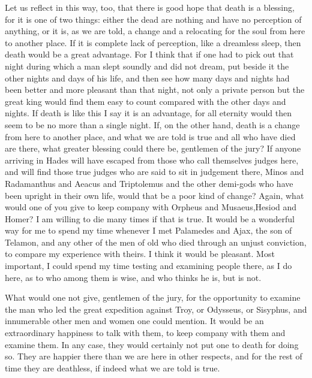 Let us reflect in this way, too, that there is good hope that death is a blessing, for it is one of
two things: either the dead are nothing and have no perception of anything, or it is, as we are told,
a change and a relocating for the soul from here to another place. If it is complete lack of
perception, like a dreamless sleep, then death would be a great advantage. For I think that if one
had to pick out that night during which a man slept soundly and did not dream, put beside it the
other nights and days of his life, and then see how many days and nights had been better and more
pleasant than that night, not only a private person but the great king would find them easy to count
compared with the other days and nights. If death is like this I say it is an advantage, for all eternity
would then seem to be no more than a single night. If, on the other hand, death is a change from
here to another place, and what we are told is true and all who have died are there, what greater
blessing could there be, gentlemen of the jury? If anyone arriving in Hades will have escaped from
those who call themselves judges here, and will find those true judges who are said to sit in
judgement there, Minos and Radamanthus and Aeacus and Triptolemus and the other demi-gods
who have been upright in their own life, would that be a poor kind of change? Again, what would
one of you give to keep company with Orpheus and Musaeus,Hesiod and Homer? I am willing to
die many times if that is true. It would be a wonderful way for me to spend my time whenever I
met Palamedes and Ajax, the son of Telamon, and any other of the men of old who died through
an unjust conviction, to compare my experience with theirs. I think it would be pleasant. Most
important, I could spend my time testing and examining people there, as I do here, as to who
among them is wise, and who thinks he is, but is not.

What would one not give, gentlemen of the jury, for the opportunity to examine the man who
led the great expedition against Troy, or Odysseus, or Sisyphus, and innumerable other men and
women one could mention. It would be an extraordinary happiness to talk with them, to keep
company with them and examine them. In any case, they would certainly not put one to death for
doing so. They are happier there than we are here in other respects, and for the rest of time they
are deathless, if indeed what we are told is true.

